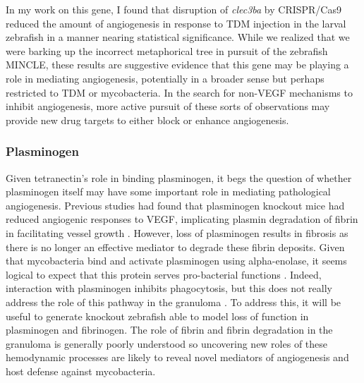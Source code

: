In my work on this gene, I found that disruption of \textit{clec3ba} by CRISPR/Cas9 reduced the amount of angiogenesis in response to TDM injection in the larval zebrafish in a manner nearing statistical significance. While we realized that we were barking up the incorrect metaphorical tree in pursuit of the zebrafish MINCLE, these results are suggestive evidence that this gene may be playing a role in mediating angiogenesis, potentially in a broader sense but perhaps restricted to TDM or mycobacteria. In the search for non\hyp{}VEGF mechanisms to inhibit angiogenesis, more active pursuit of these sorts of observations may provide new drug targets to either block or enhance angiogenesis. 

\subsubsection{Plasminogen}\label{plg}

Given tetranectin's role in binding plasminogen, it begs the question of whether plasminogen itself may have some important role in mediating pathological angiogenesis. Previous studies had found that plasminogen knockout mice had reduced angiogenic responses to VEGF, implicating plasmin degradation of fibrin in facilitating vessel growth \citep{Oh2003}. However, loss of plasminogen results in fibrosis as there is no longer an effective mediator to degrade these fibrin deposits. Given that mycobacteria bind and activate plasminogen using alpha\hyp{}enolase, it seems logical to expect that this protein serves pro\hyp{}bacterial functions \citep{Monroy2000}. Indeed, interaction with plasminogen inhibits phagocytosis, but this does not really address the role of this pathway in the granuloma \citep{EcheverriaValencia2019}. To address this, it will be useful to generate knockout zebrafish able to model loss of function in plasminogen and fibrinogen. The role of fibrin and fibrin degradation in the granuloma is generally poorly understood so uncovering new roles of these hemodynamic processes are likely to reveal novel mediators of angiogenesis and host defense against mycobacteria.

